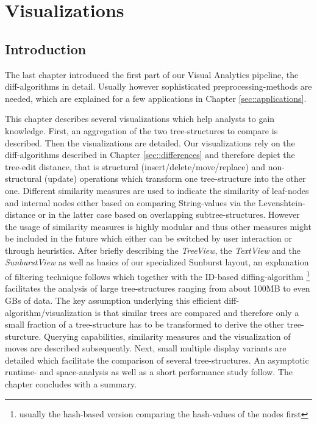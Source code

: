 \section{Visualizations}\label{sec::visualizations}
\subsection{Introduction}
The last chapter introduced the first part of our Visual Analytics pipeline, the diff-algorithms in detail. Usually however sophisticated preprocessing-methods are needed, which are explained for a few applications in Chapter \ref{sec::applications}.

This chapter describes several visualizations which help analysts to gain knowledge. First, an aggregation of the two tree-structures to compare is described. Then the visualizations are detailed. Our visualizations rely on the diff-algorithms described in Chapter \ref{sec::differences} and therefore depict the tree-edit distance, that is structural (insert/delete/move/replace) and non-structural (update) operations which transform one tree-structure into the other one. Different similarity measures are used to indicate the similarity of leaf-nodes and internal nodes either based on comparing String-values via the Levenshtein-distance or in the latter case based on overlapping subtree-structures. However the usage of similarity measures is highly modular and thus other measures might be included in the future which either can be switched by user interaction or through heuristics. After briefly describing the \emph{TreeView}, the \emph{TextView} and the \emph{SunburstView} as well as basics of our specialized Sunburst layout, an explanation of filtering technique follows which together with the ID-based diffing-algorithm \footnote{usually the hash-based version comparing the hash-values of the nodes first} facilitates the analysis of large tree-structures ranging from about 100MB to even GBs of data. The key assumption underlying this efficient diff-algorithm/visualization is that similar trees are compared and therefore only a small fraction of a tree-structure has to be transformed to derive the other tree-sturcture. Querying capabilities, similarity measures and the visualization of moves are described subsequently. Next, small multiple display variants are detailed which facilitate the comparison of several tree-structures. An asymptotic runtime- and space-analysis as well as a short performance study follow. The chapter concludes with a summary.

